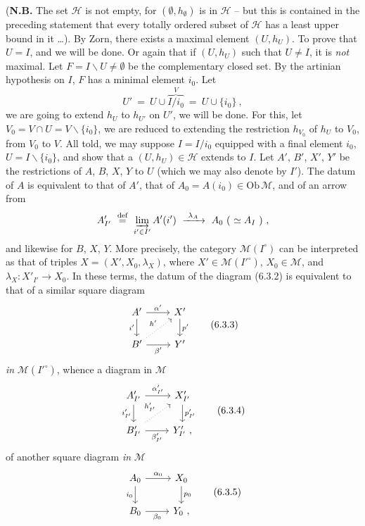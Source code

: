 (\textbf{N.B.} The set $\mathcal{H}$ is not empty, for $(\emptyset, h_{\emptyset})$ is in $\mathcal{H}$ -- but this is contained in the preceding statement that every totally ordered subset of $\mathcal{H}$ has a least upper bound in it \dots). By Zorn, there exists a maximal element $(U, h_U)$. To prove that $U = I$, and we will be done. Or again that if $(U, h_U)$ such that $U \neq I$, it is \textit{not} maximal. Let $F = I\backslash U \neq \emptyset$ be the complementary closed set. By the artinian hypothesis on $I$, $F$ has a minimal element $i_0$. Let
\[
U' \ =\ U \cup \overbrace{I/i_0}^{V} \ =\ U \cup \{i_0\}\ ,
\]
we are going to extend $h_U$ to $h_{U'}$ on $U'$, we will be done. For this, let $V_0 = V \cap U = V\backslash\{i_0\}$, we are reduced to extending the restriction $h_{V_0}$ of $h_U$ to $V_0$, from $V_0$ to $V$. All told, we may suppose $I = I/i_0$ equipped with a final element $i_0$, $U = I\backslash\{i_0\}$, and show that a $(U, h_U) \in \mathcal{H}$ extends to $I$. Let $A'$, $B'$, $X'$, $Y'$ be the restrictions of $A$, $B$, $X$, $Y$ to $U$ (which we may also denote by $I'$). The datum of $A$ %
is equivalent to that of $A'$, that of $A_0 = A(i_0) \in \mathrm{Ob}\,\mathcal{M}$, and of an arrow from
\[
A'_{I'} \ \overset{\text{def}}{=}\ \varinjlim\limits_{i' \in I'} A'(i') \ \xrightarrow{\ \lambda_A\ }\ A_0\ (\ \simeq A_I\ )\ ,
\]
and likewise for $B$, $X$, $Y$. More precisely, the category $\mathcal{M}(I^{\circ})$ can be interpreted as that of triples $X = (X', X_0, \lambda_X)$, where $X' \in \mathcal{M}(I'^{\circ})$, $X_0 \in \mathcal{M}$, and $\lambda_X : X'_{I'} \longrightarrow X_0$. In these terms, the datum of the diagram (6.3.2) is equivalent to that of a similar square diagram
\[
\begin{tikzcd}
A' \arrow[r, "\alpha'"] \arrow[d, "i'"'] & X' \arrow[d, "p'"] \\
B' \arrow[r, "\beta'"'] \arrow[ur, dotted, "h'"] & Y'
\end{tikzcd}
\tag*{(6.3.3)}
\]
\textit{in} $\mathcal{M}(I'^{\circ})$, whence a diagram in $\mathcal{M}$
\[
\begin{tikzcd}
A'_{I'} \arrow[r, "\alpha'_{I'}"] \arrow[d, "i'_{I'}"'] & X'_{I'} \arrow[d, "p'_{I'}"] \\
B'_{I'} \arrow[r, "\beta'_{I'}"'] \arrow[ur, dotted, "h'_{I'}"] & Y'_{I'}\ ,
\end{tikzcd}
\tag*{(6.3.4)}
\]
of another square diagram \textit{in} $\mathcal{M}$
\[
\begin{tikzcd}
A_0 \arrow[r, "\alpha_0"] \arrow[d, "i_0"'] & X_0 \arrow[d, "p_0"] \\
B_0 \arrow[r, "\beta_0"'] & Y_0\ ,
\end{tikzcd}
\tag*{(6.3.5)}
\]
